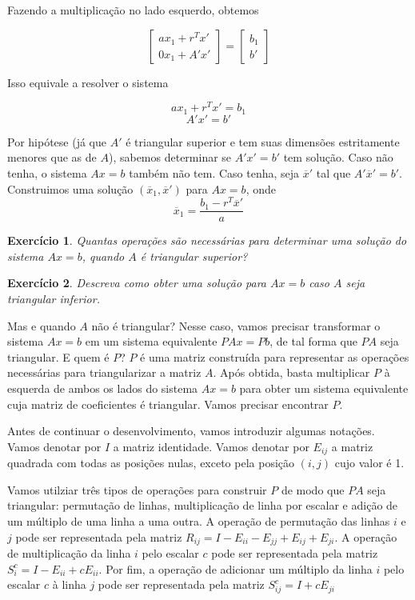 \documentclass[]{article}
\newtheorem{exercicio}{Exercício}
\numberwithin{equation}{section}
\begin{document}
Fazendo a multiplicação no lado esquerdo, obtemos

$$
\begin{bmatrix}
ax_1 + r^Tx' \\
0x_1 + A'x'
\end{bmatrix}
=
\begin{bmatrix}
b_1 \\
b'
\end{bmatrix}
$$

Isso equivale a resolver o sistema

$$
ax_1 + r^Tx' = b_1
$$
$$
A'x' = b'
$$

Por hipótese (já que $A'$ é triangular superior e tem suas dimensões estritamente menores que as de $A$), sabemos determinar se $A'x' = b'$ tem solução. Caso não tenha, o sistema $Ax = b$ também não tem. Caso tenha, seja $\overline{x}'$ tal que $A'\overline{x}' = b'$. Construimos uma solução $(\overline{x}_1, \overline{x}')$ para $Ax = b$, onde
$$
\overline{x}_1 = \frac{b_1 - r^T\overline{x}'}{a}
$$

\begin{exercicio}
	Quantas operações são necessárias para determinar uma solução do sistema $Ax = b$, quando $A$ é triangular superior?
\end{exercicio}

\begin{exercicio}
	Descreva como obter uma solução para $Ax = b$ caso $A$ seja triangular inferior.
\end{exercicio}

Mas e quando $A$ não é triangular? Nesse caso, vamos precisar transformar o sistema $Ax = b$ em um sistema equivalente $PAx = Pb$, de tal forma que $PA$ seja triangular. E quem é $P$? $P$ é uma matriz construída para representar as operações necessárias para triangularizar a matriz $A$. Após obtida, basta multiplicar $P$ à esquerda de ambos os lados do sistema $Ax = b$ para obter um sistema equivalente cuja matriz de coeficientes é triangular. Vamos precisar encontrar $P$.

Antes de continuar o desenvolvimento, vamos introduzir algumas notações. Vamos denotar por $I$ a matriz identidade. Vamos denotar por $E_{ij}$ a matriz quadrada com todas as posições nulas, exceto pela posição $(i, j)$ cujo valor é 1.

Vamos utilziar três tipos de operações para construir $P$ de modo que $PA$ seja triangular: permutação de linhas, multiplicação de linha por escalar e adição de um múltiplo de uma linha a uma outra. A operação de permutação das linhas $i$ e $j$ pode ser representada pela matriz $R_{ij} = I - E_{ii} - E_{jj} + E_{ij} + E_{ji}$. A operação de multiplicação da linha $i$ pelo escalar $c$ pode ser representada pela matriz $S_i^c = I - E_{ii} + cE_{ii}$. Por fim, a operação de adicionar um múltiplo da linha $i$ pelo escalar $c$ à linha $j$ pode ser representada pela matriz $S_{ij}^c = I + cE_{ji}$
\end{document}
